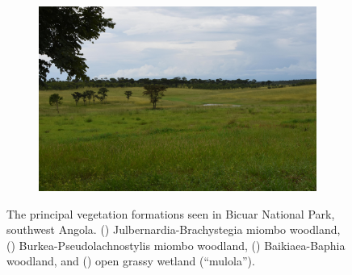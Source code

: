 \begin{refsection}
\begin{figure}[tb]
\begin{subfigure}[b]{0.45\linewidth}
		\caption{}
		\label{intro:baikiaea}
	\end{subfigure}
	\hfill
	\begin{subfigure}[b]{0.45\linewidth}
		\includegraphics[width=\linewidth]{img/bicuar_photos/mulola_crop}
		\caption{}
		\label{intro:mulola}
	\end{subfigure}
	\caption[Bicuar National Park vegetation type photographs]{The principal vegetation formations seen in Bicuar National Park, southwest Angola. () Julbernardia-Brachystegia miombo woodland, () Burkea-Pseudolachnostylis miombo woodland, () Baikiaea-Baphia woodland, and () open grassy wetland (``mulola'').}
	\label{intro:bicuar_photos}
\end{figure}


\end{refsection}
